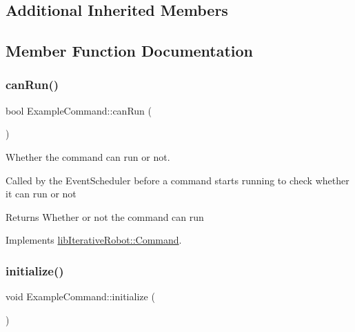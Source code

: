\subsection*{Additional Inherited Members}


\subsection{Member Function Documentation}
\mbox{\label{class_example_command_ad1df0170d99bcef6c6bc1676551f9539}} 
\subsubsection{\texorpdfstring{canRun()}{canRun()}}
{\footnotesize\ttfamily bool Example\+Command\+::can\+Run (\begin{DoxyParamCaption}{ }\end{DoxyParamCaption})\hspace{0.3cm}{\ttfamily [virtual]}}



Whether the command can run or not. 

Called by the Event\+Scheduler before a command starts running to check whether it can run or not \begin{DoxyReturn}{Returns}
Whether or not the command can run 
\end{DoxyReturn}


Implements \mbox{\hyperlink{classlib_iterative_robot_1_1_command_aebef0fdf029a15ee48fbb778c4265609}{lib\+Iterative\+Robot\+::\+Command}}.

\mbox{\label{class_example_command_ae7bea17127c1697acbf90d6022eb5b5d}} 
\subsubsection{\texorpdfstring{initialize()}{initialize()}}
{\footnotesize\ttfamily void Example\+Command\+::initialize (\begin{DoxyParamCaption}{ }\end{DoxyParamCaption})\hspace{0.3cm}{\ttfamily [virtual]}}



